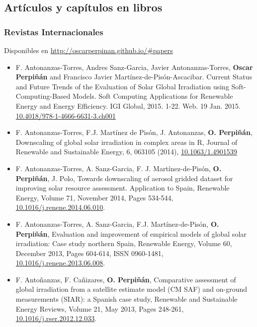\documentclass[article, a4paper]{memoir}
\begin{document}
\subsection{Artículos y capítulos en libros}
\label{sec-5-2}
\subsubsection{Revistas Internacionales}
\label{sec-5-2-1}
Disponibles en \url{http://oscarperpinan.github.io/#papers}

\begin{itemize}
\item F. Antonanzas-Torres, Andres Sanz-Garcia, Javier Antonanzas-Torres, \textbf{Oscar Perpiñán} and Francisco Javier Martínez-de-Pisón-Ascacibar. \guillemotleft{}Current Status and Future Trends of the Evaluation of Solar Global Irradiation using Soft-Computing-Based Models.\guillemotright{} Soft Computing Applications for Renewable Energy and Energy Efficiency. IGI Global, 2015. 1-22. Web. 19 Jan. 2015. \url{10.4018/978-1-4666-6631-3.ch001}

\item F. Antonanzas-Torres, F.J. Martínez de Pisón, J. Antonanzas, \textbf{O. Perpiñán}, Downscaling of global solar irradiation in complex areas in R, Journal of Renewable and Sustainable Energy, 6, 063105 (2014), \href{http://dx.doi.org/10.1063/1.4901539}{10.1063/1.4901539}

\item F. Antonanzas-Torres, A. Sanz-Garcia, F. J. Martínez-de-Pisón, \textbf{O. Perpiñán}, J. Polo, Towards downscaling of aerosol gridded dataset for improving solar resource assessment. Application to Spain, Renewable Energy, Volume 71, November 2014, Pages 534-544, \href{http://dx.doi.org/10.1016/j.renene.2014.06.010}{10.1016/j.renene.2014.06.010}.

\item F. Antonanzas-Torres, A. Sanz-Garcia, F.J. Martínez-de-Pisón, \textbf{O. Perpiñán}, Evaluation and improvement of empirical models of global solar irradiation: Case study northern Spain, Renewable Energy, Volume 60, December 2013, Pages 604-614, ISSN 0960-1481, \href{http://dx.doi.org/10.1016/j.renene.2013.06.008}{10.1016/j.renene.2013.06.008}.

\item F. Antoñanzas, F. Cañizares, \textbf{O. Perpiñán}, Comparative assessment of global irradiation from a satellite estimate model (CM SAF) and on-ground measurements (SIAR): a Spanish case study, Renewable and Sustainable Energy Reviews, Volume 21, May 2013, Pages 248-261, \href{http://dx.doi.org/10.1016/j.rser.2012.12.033}{10.1016/j.rser.2012.12.033}.


\end{itemize}
\end{document}
